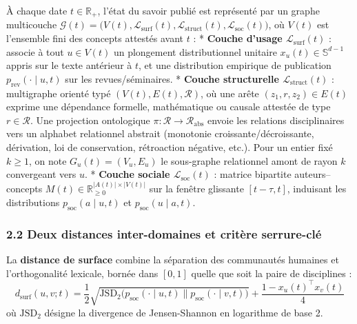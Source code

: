 \documentclass[a4paper,11pt]{article}
\begin{document}
À chaque date \(t \in \mathbb{R}_+\), l'état du savoir publié est
représenté par un graphe multicouche
\(\mathcal{G}(t) = \big(V(t), \mathcal{L}_{\text{surf}}(t), \mathcal{L}_{\text{struct}}(t), \mathcal{L}_{\text{soc}}(t)\big)\),
où \(V(t)\) est l'ensemble fini des concepts attestés avant \(t\) : *
\textbf{Couche d'usage \(\mathcal{L}_{\text{surf}}(t)\)} : associe à
tout \(u \in V(t)\) un plongement distributionnel unitaire
\(x_u(t) \in \mathbb{S}^{d-1}\) appris sur le texte antérieur à \(t\),
et une distribution empirique de publication
\(p_{\text{rev}}(\cdot \mid u, t)\) sur les revues/séminaires. *
\textbf{Couche structurelle \(\mathcal{L}_{\text{struct}}(t)\)} :
multigraphe orienté typé \((V(t), E(t), \mathcal{R})\), où une arête
\((z_1, r, z_2) \in E(t)\) exprime une dépendance formelle, mathématique
ou causale attestée de type \(r \in \mathcal{R}\). Une projection
ontologique \(\pi : \mathcal{R} \to \mathcal{R}_{\text{abs}}\) envoie
les relations disciplinaires vers un alphabet relationnel abstrait
(monotonie croissante/décroissante, dérivation, loi de conservation,
rétroaction négative, etc.). Pour un entier fixé \(k \ge 1\), on note
\(G_u(t) = (V_u, E_u)\) le sous-graphe relationnel amont de rayon \(k\)
convergeant vers \(u\). * \textbf{Couche sociale
\(\mathcal{L}_{\text{soc}}(t)\)} : matrice bipartite auteurs--concepts
\(M(t) \in \mathbb{R}_{\ge 0}^{|A(t)| \times |V(t)|}\) sur la fenêtre
glissante \([t-\tau, t]\), induisant les distributions
\(p_{\text{soc}}(a \mid u, t)\) et \(p_{\text{soc}}(u \mid a, t)\).

\subsubsection*{2.2 Deux distances inter-domaines et critère serrure-clé}

La \textbf{distance de surface} combine la séparation des communautés
humaines et l'orthogonalité lexicale, bornée dans \([0,1]\) quelle que
soit la paire de disciplines :
\[d_{\text{surf}}(u, v; t) = \frac{1}{2}\sqrt{\text{JSD}_2\!\big(p_{\text{soc}}(\cdot \mid u, t) \parallel p_{\text{soc}}(\cdot \mid v, t)\big)} + \frac{1 - x_u(t)^\top x_v(t)}{4}\]
où \(\text{JSD}_2\) désigne la divergence de Jensen-Shannon en
logarithme de base 2.
\end{document}
